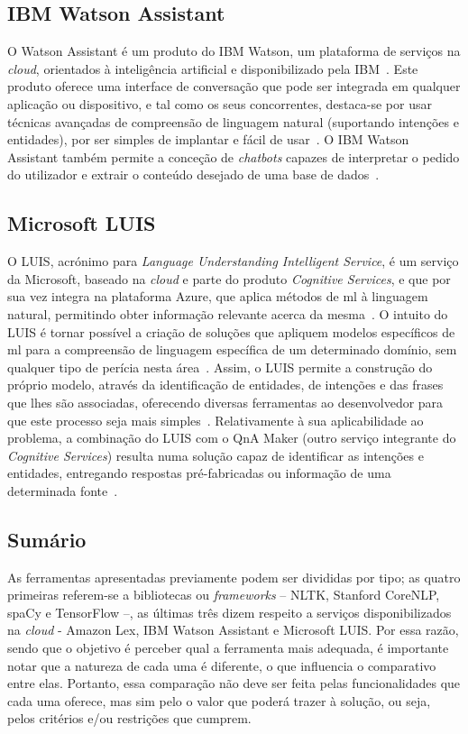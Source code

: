 \subsection{IBM Watson Assistant}
O Watson Assistant é um produto do IBM Watson, um plataforma de serviços na \textit{cloud}, orientados à inteligência artificial e disponibilizado pela IBM~\parencite{ibm_watson_official}. Este produto oferece uma interface de conversação que pode ser integrada em qualquer aplicação ou dispositivo, e tal como os seus concorrentes, destaca-se por usar técnicas avançadas de compreensão de linguagem natural (suportando intenções e entidades), por ser simples de implantar e fácil de usar~\parencite{ibm_watson_assistant_official}. O IBM Watson Assistant também permite a conceção de \textit{chatbots} capazes de interpretar o pedido do utilizador e extrair o conteúdo desejado de uma base de dados~\parencite{ibm_watson_assistant_database_driven_chatbot}.

\subsection{Microsoft LUIS}
O LUIS, acrónimo para \textit{Language Understanding Intelligent Service}, é um serviço da Microsoft, baseado na \textit{cloud} e parte do produto \textit{Cognitive Services}, e que por sua vez integra na plataforma Azure, que aplica métodos de \gls{ml} à linguagem natural, permitindo obter informação relevante acerca da mesma~\parencite{microsoft_luis_official}. O intuito do LUIS é tornar possível a criação de soluções que apliquem modelos específicos de \gls{ml} para a compreensão de linguagem específica de um determinado domínio, sem qualquer tipo de perícia nesta área~\parencite{luis_fast_easy_language_understanding}. Assim, o LUIS permite a construção do próprio modelo, através da identificação de entidades, de intenções e das frases que lhes são associadas, oferecendo diversas ferramentas ao desenvolvedor para que este processo seja mais simples~\parencite{microsoft_luis_official}. Relativamente à sua aplicabilidade ao problema, a combinação do LUIS com o QnA Maker (outro serviço integrante do \textit{Cognitive Services}) resulta numa solução capaz de identificar as intenções e entidades, entregando respostas pré-fabricadas ou informação de uma determinada fonte~\parencite{microsoft_luis_use_nl_processing_service}.

\subsection{Sumário}
As ferramentas apresentadas previamente podem ser divididas por tipo; as quatro primeiras referem-se a bibliotecas ou \textit{frameworks} -- NLTK, Stanford CoreNLP, spaCy e TensorFlow --, as últimas três dizem respeito a serviços disponibilizados na \textit{cloud} - Amazon Lex, IBM Watson Assistant e Microsoft LUIS. Por essa razão, sendo que o objetivo é perceber qual a ferramenta mais adequada, é importante notar que a natureza de cada uma é diferente, o que influencia o comparativo entre elas. Portanto, essa comparação não deve ser feita pelas funcionalidades que cada uma oferece, mas sim pelo o valor que poderá trazer à solução, ou seja, pelos critérios e/ou restrições que cumprem.

